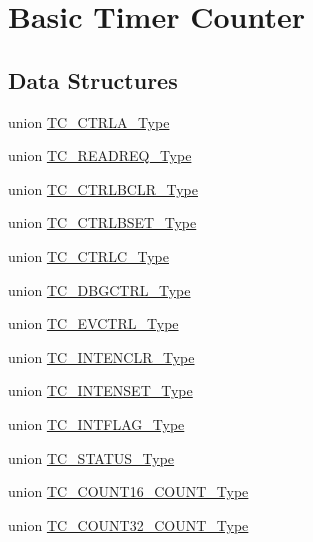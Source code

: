 \hypertarget{group___s_a_m_d21___t_c}{}\section{Basic Timer Counter}
\label{group___s_a_m_d21___t_c}
\subsection*{Data Structures}
\begin{DoxyCompactItemize}
\item 
union \mbox{\hyperlink{union_t_c___c_t_r_l_a___type}{T\+C\+\_\+\+C\+T\+R\+L\+A\+\_\+\+Type}}
\item 
union \mbox{\hyperlink{union_t_c___r_e_a_d_r_e_q___type}{T\+C\+\_\+\+R\+E\+A\+D\+R\+E\+Q\+\_\+\+Type}}
\item 
union \mbox{\hyperlink{union_t_c___c_t_r_l_b_c_l_r___type}{T\+C\+\_\+\+C\+T\+R\+L\+B\+C\+L\+R\+\_\+\+Type}}
\item 
union \mbox{\hyperlink{union_t_c___c_t_r_l_b_s_e_t___type}{T\+C\+\_\+\+C\+T\+R\+L\+B\+S\+E\+T\+\_\+\+Type}}
\item 
union \mbox{\hyperlink{union_t_c___c_t_r_l_c___type}{T\+C\+\_\+\+C\+T\+R\+L\+C\+\_\+\+Type}}
\item 
union \mbox{\hyperlink{union_t_c___d_b_g_c_t_r_l___type}{T\+C\+\_\+\+D\+B\+G\+C\+T\+R\+L\+\_\+\+Type}}
\item 
union \mbox{\hyperlink{union_t_c___e_v_c_t_r_l___type}{T\+C\+\_\+\+E\+V\+C\+T\+R\+L\+\_\+\+Type}}
\item 
union \mbox{\hyperlink{union_t_c___i_n_t_e_n_c_l_r___type}{T\+C\+\_\+\+I\+N\+T\+E\+N\+C\+L\+R\+\_\+\+Type}}
\item 
union \mbox{\hyperlink{union_t_c___i_n_t_e_n_s_e_t___type}{T\+C\+\_\+\+I\+N\+T\+E\+N\+S\+E\+T\+\_\+\+Type}}
\item 
union \mbox{\hyperlink{union_t_c___i_n_t_f_l_a_g___type}{T\+C\+\_\+\+I\+N\+T\+F\+L\+A\+G\+\_\+\+Type}}
\item 
union \mbox{\hyperlink{union_t_c___s_t_a_t_u_s___type}{T\+C\+\_\+\+S\+T\+A\+T\+U\+S\+\_\+\+Type}}
\item 
union \mbox{\hyperlink{union_t_c___c_o_u_n_t16___c_o_u_n_t___type}{T\+C\+\_\+\+C\+O\+U\+N\+T16\+\_\+\+C\+O\+U\+N\+T\+\_\+\+Type}}
\item 
union \mbox{\hyperlink{union_t_c___c_o_u_n_t32___c_o_u_n_t___type}{T\+C\+\_\+\+C\+O\+U\+N\+T32\+\_\+\+C\+O\+U\+N\+T\+\_\+\+Type}}
\item 

\end{DoxyCompactItemize}
